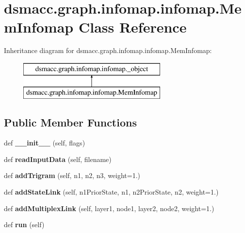 \hypertarget{classdsmacc_1_1graph_1_1infomap_1_1infomap_1_1MemInfomap}{}\section{dsmacc.\+graph.\+infomap.\+infomap.\+Mem\+Infomap Class Reference}
\label{classdsmacc_1_1graph_1_1infomap_1_1infomap_1_1MemInfomap}
Inheritance diagram for dsmacc.\+graph.\+infomap.\+infomap.\+Mem\+Infomap\+:\begin{figure}[H]
\begin{center}
\leavevmode
\includegraphics[height=2.000000cm]{classdsmacc_1_1graph_1_1infomap_1_1infomap_1_1MemInfomap}
\end{center}
\end{figure}
\subsection*{Public Member Functions}
\begin{DoxyCompactItemize}
\item 
\mbox{\label{classdsmacc_1_1graph_1_1infomap_1_1infomap_1_1MemInfomap_a3abd3b7c5406e5b8c2634d97e227346d}} 
def {\bfseries \+\_\+\+\_\+init\+\_\+\+\_\+} (self, flags)
\item 
\mbox{\label{classdsmacc_1_1graph_1_1infomap_1_1infomap_1_1MemInfomap_acec3dec0cbe3cff8d68d26fdb80e14e9}} 
def {\bfseries read\+Input\+Data} (self, filename)
\item 
\mbox{\label{classdsmacc_1_1graph_1_1infomap_1_1infomap_1_1MemInfomap_a3a1db58995dbd4fdadcd9563c62e4501}} 
def {\bfseries add\+Trigram} (self, n1, n2, n3, weight=1.)
\item 
\mbox{\label{classdsmacc_1_1graph_1_1infomap_1_1infomap_1_1MemInfomap_a52238d50b2f299d2d893c3714ffe1f88}} 
def {\bfseries add\+State\+Link} (self, n1\+Prior\+State, n1, n2\+Prior\+State, n2, weight=1.)
\item 
\mbox{\label{classdsmacc_1_1graph_1_1infomap_1_1infomap_1_1MemInfomap_a5218bd88cb158ddedba371d54de0d839}} 
def {\bfseries add\+Multiplex\+Link} (self, layer1, node1, layer2, node2, weight=1.)
\item 
\mbox{\label{classdsmacc_1_1graph_1_1infomap_1_1infomap_1_1MemInfomap_a267e13a7a2ec0ecbc9fd7678e759e0c6}} 
def {\bfseries run} (self)
\end{DoxyCompactItemize}
